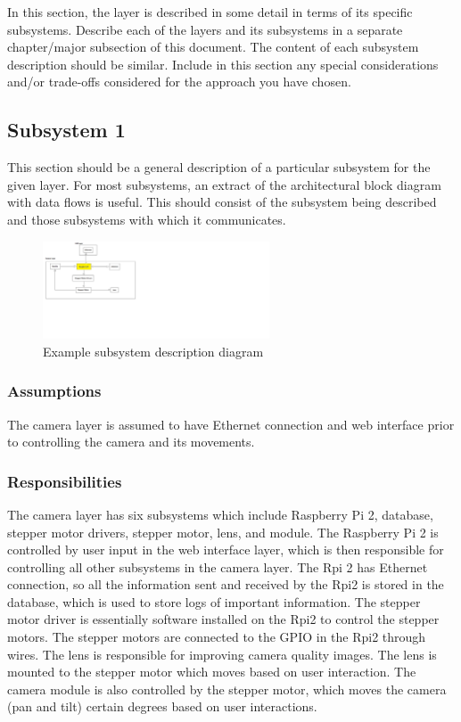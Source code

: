 In this section, the layer is described in some detail in terms of its specific subsystems. Describe each of the layers and its subsystems in a separate chapter/major subsection of this document. The content of each subsystem description should be similar. Include in this section any special considerations and/or trade-offs considered for the approach you have chosen.

\subsection{Subsystem 1}
This section should be a general description of a particular subsystem for the given layer. For most subsystems, an extract of the architectural block diagram with data flows is useful. This should consist of the subsystem being described and those subsystems with which it communicates.

\begin{figure}[h!]
	\centering
 	\includegraphics[width=0.60\textwidth]{images/camera_layer.png}
 \caption{Example subsystem description diagram}
\end{figure}

\subsubsection{Assumptions}
The camera layer is assumed to have Ethernet connection and web interface prior to controlling the camera and its movements.  

\subsubsection{Responsibilities}
The camera layer has six subsystems which include Raspberry Pi 2, database, stepper motor drivers, stepper motor, lens, and module. The Raspberry Pi 2 is controlled by user input in the web interface layer, which is then responsible for controlling all other subsystems in the camera layer. The Rpi 2 has Ethernet connection, so all the information sent and received by the Rpi2 is stored in the database, which is used to store logs of important information. The stepper motor driver is essentially software installed on the Rpi2 to control the stepper motors. The stepper motors are connected to the GPIO in the Rpi2 through wires. The lens is responsible for improving camera quality images. The lens is mounted to the stepper motor which moves based on user interaction. The camera module is also controlled by the stepper motor, which moves the camera (pan and tilt) certain degrees based on user interactions.

